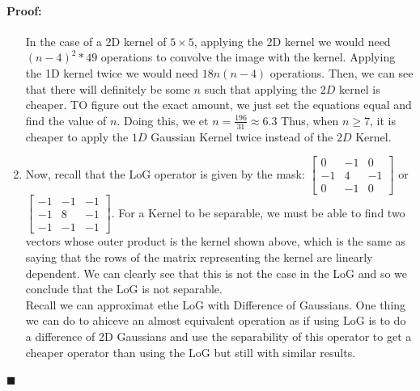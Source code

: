 \documentclass[12pt]{article}
\newenvironment{proof}{\paragraph{Proof: }}{\hfill$\blacksquare$}
\begin{document}
\begin{proof}
\begin{enumerate}
In the case of a 2D kernel of $5 \times 5$, applying the 2D kernel we would need $(n-4)^2 *49$ operations to convolve the image with the kernel. Applying the 1D kernel twice we would need $18n(n-4)$ operations. Then, we can see that there will definitely be some $n$ such that applying the $2D$ kernel is cheaper. TO figure out the exact amount, we just set the equations equal and find the value of $n$. Doing this, we et $n = \frac{196}{31} \approx 6.3$ Thus, when $n \geq 7$, it is cheaper to apply the $1D$ Gaussian Kernel twice instead of the $2D$ Kernel.

\item Now, recall that the LoG operator is given by the mask: $\left[ \begin{matrix}  0 & -1 & 0 \\ -1 & 4 & -1 \\ 0 & -1 & 0\end{matrix} \right]$ or $\left[\begin{matrix}  -1 & -1 & -1 \\ -1 & 8 & -1 \\ -1 & -1 & -1\end{matrix} \right]$. For a Kernel to be separable, we must be able to find two vectors whose outer product is the kernel shown above, which is the same as saying that the rows of the matrix representing the kernel are linearly dependent. We can clearly see that this is not the case in the LoG and so we conclude that the LoG is not separable. \\

Recall we can approximat ethe LoG with Difference of Gaussians. One thing we can do to ahiceve an almost equivalent operation as if using LoG is to do a difference of 2D Gaussians and use the separability of this operator to get a cheaper operator than using the LoG but still with similar results.


\end{enumerate}
\end{proof}
\end{document}
